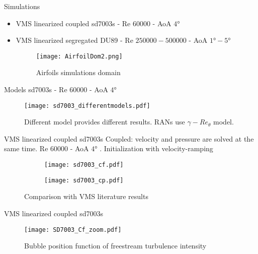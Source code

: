 



\begin{frame}{Simulations}
\begin{itemize}
\item VMS linearized coupled sd7003s - Re $\num{60000}$ - AoA $\ang{4}$ 
\item VMS linearized segregated DU89 - Re $\num{250000}-\num{500000}$ - AoA $\ang{1}-\ang{5}$ 

\begin{figure}[h]
     \centering          
         \texttt{[image:  AirfoilDom2.png]}
         \caption{Airfoils simulations domain}
     \end{figure} 
\end{itemize}
\end{frame}

\begin{frame}{Models}
sd7003s - Re $\num{60000}$ - AoA $\ang{4}$ 
\begin{figure}[h]
     \centering          
         \texttt{[image:  sd7003\_differentmodels.pdf]}
         \caption{Different model provides different results. RANs use $\gamma -Re_ \theta$ model.}
     \end{figure} 
\end{frame}




\begin{frame}{VMS linearized coupled sd7003s}
Coupled: velocity and pressure are solved at the same time.
Re $\num{60000}$ - AoA $\ang{4}$ . Initialization with velocity-ramping
\begin{figure}[h]
     \centering          
     \begin{subfigure}[h]{0.45\textwidth}
              \centering
         \texttt{[image: sd7003\_cf.pdf]}
    \end{subfigure}
          \hfill
     \begin{subfigure}[h]{0.45\textwidth}
      \centering
         \texttt{[image: sd7003\_cp.pdf]}
     \end{subfigure}
\caption{Comparison with VMS literature results}
     \end{figure} 
     
\end{frame}

\begin{frame}{ VMS linearized coupled sd7003s}
\begin{figure}[h]
     \centering          
         \texttt{[image: SD7003\_Cf\_zoom.pdf]}
         \caption{Bubble position function of freestream turbulence intensity}
     \end{figure} 
\end{frame}




